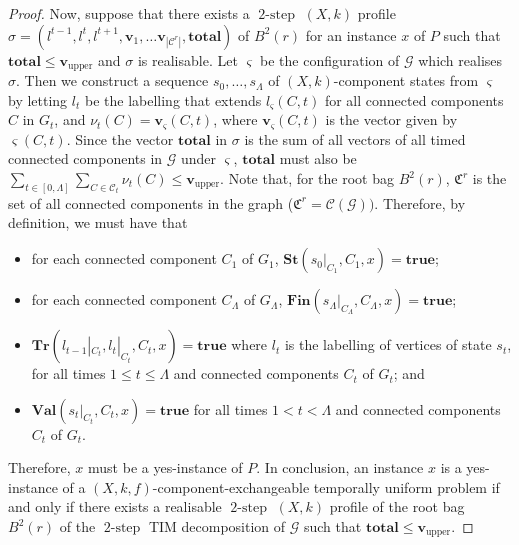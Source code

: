 \documentclass[10pt,a4paper]{amsart}
\DeclareMathOperator{\twostep}{2-step}
\begin{document}
\begin{proof}
    Now, suppose that there exists a $\twostep$ $(X,k)$ profile $\sigma=(l^{t-1},l^t,l^{t+1},\textbf{v}_1,\ldots\textbf{v}_{|\mathcal{C}^r|}, \textbf{total})$ of $B^2(r)$ for an instance $x$ of $P$ such that $\textbf{total}\leq \textbf{v}_{\text{upper}}$ and $\sigma$ is realisable. Let $\varsigma$ be the configuration of $\mathcal{G}$ which realises $\sigma$. Then we construct a sequence $s_0,\ldots, s_{\Lambda}$ of $(X,k)$-component states from $\varsigma$ by letting $l_{t}$ be the labelling that extends $l_{\varsigma}(C,t)$ for all connected components $C$ in $G_t$, and $\nu_t(C)=\textbf{v}_{\varsigma}(C,t)$, where $\textbf{v}_{\varsigma}(C,t)$ is the vector given by $\varsigma(C,t)$. Since the vector $\textbf{total}$ in $\sigma$ is the sum of all vectors of all timed connected components in $\mathcal{G}$ under $\varsigma$, $\textbf{total}$ must also be $\sum_{t\in[0,\Lambda]}\sum_{C\in\mathcal{C}_t}\nu_t(C)\leq \textbf{v}_{\text{upper}}$. Note that, for the root bag $B^2(r)$, $\mathfrak{C}^r$ is the set of all connected components in the graph ($\mathfrak{C}^r=\mathcal{C}(\mathcal{G}))$. Therefore, by definition, we must have that 
    \begin{itemize}
        \item for each connected component $C_1$ of $G_1$, $\textbf{St}(s_0|_{C_1},C_1,x)=\textbf{true}$;
        \item for each connected component $C_{\Lambda}$ of $G_{\Lambda}$, $\textbf{Fin}(s_{\Lambda}|_{C_{\Lambda}},C_{\Lambda},x)=\textbf{true}$;
        \item $\textbf{Tr}(l_{t-1}|_{C_t}, l_t|_{C_t}, C_t,x)=\textbf{true}$ where $l_t$ is the labelling of vertices of state $s_t$, for all times $1 \leq t \leq \Lambda$ and connected components $C_t$ of $G_t$; and
        \item $\textbf{Val}(s_t|_{C_t}, C_t,x)=\textbf{true}$ for all times $1 < t < \Lambda$ and connected components $C_t$ of $G_t$.
    \end{itemize}
    Therefore, $x$ must be a yes-instance of $P$. In conclusion, an instance $x$ is a yes-instance of a $(X,k,f)$-component-exchangeable temporally uniform problem if and only if there exists a realisable $\twostep$ $(X,k)$ profile of the root bag $B^2(r)$ of the $\twostep$ TIM decomposition of $\mathcal{G}$ such that $\textbf{total}\leq \textbf{v}_{\text{upper}}$.
\end{proof}
\end{document}
